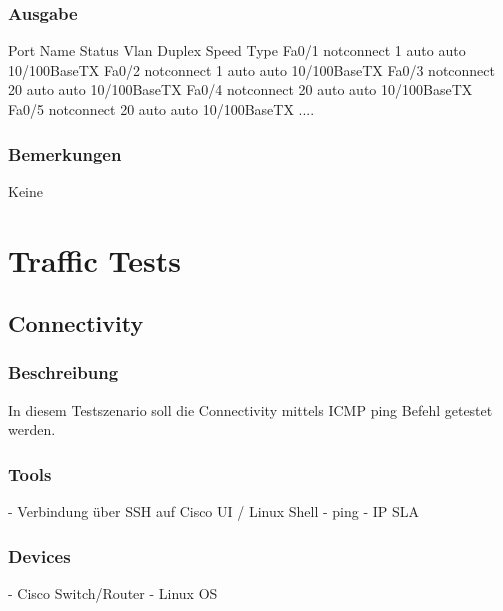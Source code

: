 \documentclass[a4,12pt]{scrartcl}
\begin{document}
\subsubsection{Ausgabe}
Port      Name               Status       Vlan       Duplex  Speed Type\newline
Fa0/1                        notconnect   1            auto   auto 10/100BaseTX\newline
Fa0/2                        notconnect   1            auto   auto 10/100BaseTX\newline
Fa0/3                        notconnect   20           auto   auto 10/100BaseTX\newline
Fa0/4                        notconnect   20           auto   auto 10/100BaseTX\newline
Fa0/5                        notconnect   20           auto   auto 10/100BaseTX\newline
....\newline
\subsubsection{Bemerkungen}
Keine




\newpage
\section{Traffic Tests}
\subsection{Connectivity}
\subsubsection{Beschreibung}
In diesem Testszenario soll die Connectivity mittels ICMP ping Befehl getestet werden.
\subsubsection{Tools}
- Verbindung über SSH auf Cisco UI / Linux Shell\newline
- ping\newline
- IP SLA\newline

\subsubsection{Devices}
- Cisco Switch/Router\newline
- Linux OS \newline
\end{document}
